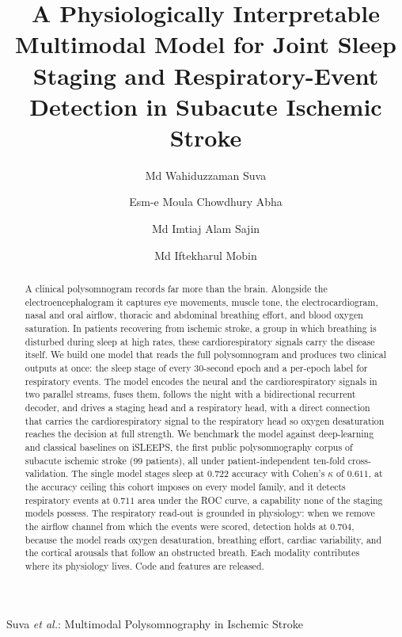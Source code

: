 \documentclass[preprint,12pt]{elsarticle}
\newcommand{\mmAcc}{0.722}
\newcommand{\mmK}{0.611}
\newcommand{\mmAuc}{0.711}
\newcommand{\noflowAuc}{0.704}
\begin{document}
\begin{frontmatter}

\title{A Physiologically Interpretable Multimodal Model for Joint Sleep Staging
and Respiratory-Event Detection in Subacute Ischemic Stroke}

\author[aiub]{Md Wahiduzzaman Suva}
\author[aiub]{Esm-e Moula Chowdhury Abha}
\author[aiub]{Md Imtiaj Alam Sajin}
\author[aiub]{Md Iftekharul Mobin}


%
{Suva \MakeLowercase{\textit{et al.}}: Multimodal Polysomnography in Ischemic Stroke}



\begin{abstract}
A clinical polysomnogram records far more than the brain. Alongside the
electroencephalogram it captures eye movements, muscle tone, the electrocardiogram,
nasal and oral airflow, thoracic and abdominal breathing effort, and blood oxygen
saturation. In patients recovering from ischemic stroke, a group in which breathing is
disturbed during sleep at high rates, these cardiorespiratory signals carry the disease
itself. We build one model that reads the full polysomnogram and produces two clinical
outputs at once: the sleep stage of every 30-second epoch and a per-epoch label for
respiratory events. The model encodes the neural and the cardiorespiratory signals in two
parallel streams, fuses them, follows the night with a bidirectional recurrent decoder, and
drives a staging head and a respiratory head, with a direct connection that carries the
cardiorespiratory signal to the respiratory head so oxygen desaturation reaches the decision at
full strength. We benchmark
the model against deep-learning and classical baselines on iSLEEPS, the first public
polysomnography corpus of subacute ischemic stroke (99 patients), all under patient-independent ten-fold
cross-validation. The single model stages sleep at $\mmAcc$ accuracy with Cohen's $\kappa$
of $\mmK$, at the accuracy ceiling this cohort imposes on every model family, and it detects
respiratory events at $\mmAuc$ area under the ROC curve, a capability none of the staging
models possess. The respiratory read-out is grounded in physiology: when we remove the
airflow channel from which the events were scored, detection holds at $\noflowAuc$, because
the model reads oxygen desaturation, breathing effort, cardiac variability, and the cortical
arousals that follow an obstructed breath. Each modality contributes where its physiology
lives. Code and features are released.
\end{abstract}


\end{frontmatter}
\end{document}
